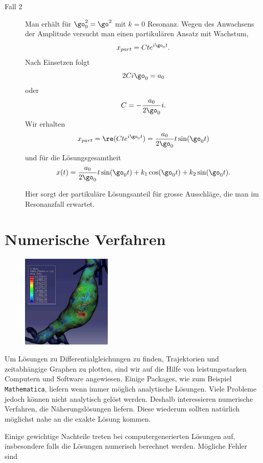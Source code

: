 \documentclass[%
draft,
11pt,%
twoside,%
titlepage,%
german,%
headsepline%
]{scrartcl}
\begin{document}
\begin{description}
\item[Fall 2] Man erh\"alt f\"ur $\go_0^2=\go^2$ mit $k=0$ Resonanz. Wegen des Anwachsens der Amplitude versucht man einen partikul\"aren Ansatz mit Wachstum,
$$x_{part}=Cte^{i\go_0 t}.$$
Nach Einsetzen folgt
$$2Ci\go_0=a_0$$
oder
$$C=-\frac{a_0}{2\go_0}i.$$
Wir erhalten
$$x_{part}=\re(Cte^{i\go_0 t})=\frac{a_0}{2\go_0}t\sin(\go_0 t)$$
und f\"ur die L\"osungsgesamtheit
$$
x(t)=\frac{a_0}{2\go_0}t\sin(\go_0 t)+k_1\cos(\go_0 t)+k_2\sin(\go_0 t).
$$
\begin{bem}
Hier sorgt der partikul\"are L\"osungsanteil f\"ur grosse Ausschl\"age, die man im Resonanzfall erwartet.
\end{bem}
\end{description}

\clearpage

\appendix

\section{Numerische Verfahren}
\begin{figure}
  \begin{center}
    \includegraphics[width=0.382\textwidth]{pictures/aneurysma}
  \end{center}
\end{figure}
Um L\"osungen zu Differentialgleichungen zu finden, Trajektorien und zeitabh\"angige Graphen zu plotten, sind wir auf die Hilfe von leistungsstarken Computern und Software angewiesen. Einige Packages, wie zum Beispiel \texttt{Mathematica}, liefern wenn immer m\"oglich analytische L\"osungen. Viele Probleme jedoch k\"onnen nicht analytisch gel\"ost werden. Deshalb interessieren numerische Verfahren, die N\"aherungsl\"osungen liefern. Diese wiederum sollten nat\"urlich m\"oglichst nahe an die exakte L\"osung kommen.

Einige gewichtige Nachteile treten bei computergenerierten L\"osungen auf, insbesondere falls die L\"osungen numerisch berechnet werden. M\"ogliche Fehler sind
\end{document}
